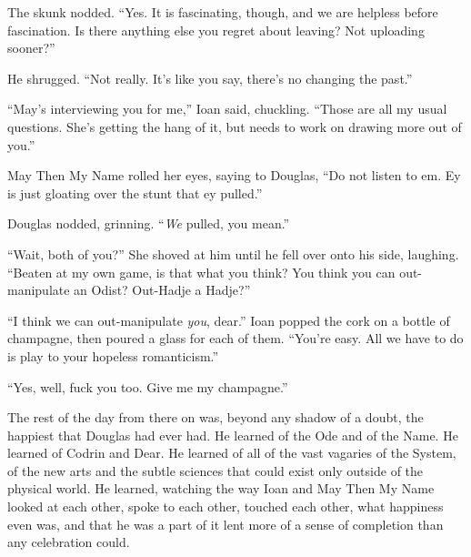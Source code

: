 The skunk nodded. ``Yes. It is fascinating, though, and we are helpless before fascination. Is there anything else you regret about leaving? Not uploading sooner?''

He shrugged. ``Not really. It's like you say, there's no changing the past.''

``May's interviewing you for me,'' Ioan said, chuckling. ``Those are all my usual questions. She's getting the hang of it, but needs to work on drawing more out of you.''

May Then My Name rolled her eyes, saying to Douglas, ``Do not listen to em. Ey is just gloating over the stunt that ey pulled.''

Douglas nodded, grinning. ``\emph{We} pulled, you mean.''

``Wait, both of you?'' She shoved at him until he fell over onto his side, laughing. ``Beaten at my own game, is that what you think? You think you can out-manipulate an Odist? Out-Hadje a Hadje?''

``I think we can out-manipulate \emph{you}, dear.'' Ioan popped the cork on a bottle of champagne, then poured a glass for each of them. ``You're easy. All we have to do is play to your hopeless romanticism.''

``Yes, well, fuck you too. Give me my champagne.''

The rest of the day from there on was, beyond any shadow of a doubt, the happiest that Douglas had ever had. He learned of the Ode and of the Name. He learned of Codrin and Dear. He learned of all of the vast vagaries of the System, of the new arts and the subtle sciences that could exist only outside of the physical world. He learned, watching the way Ioan and May Then My Name looked at each other, spoke to each other, touched each other, what happiness even was, and that he was a part of it lent more of a sense of completion than any celebration could.
